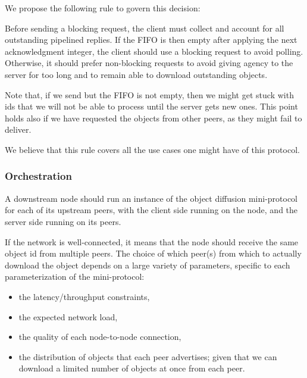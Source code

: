 We propose the following rule to govern this decision:

Before sending a blocking request, the client must collect and account for all
outstanding pipelined replies. If the FIFO is then empty after applying the next
acknowledgment integer, the client should use a blocking request to avoid polling.
Otherwise, it should prefer non-blocking requests to avoid giving agency to the
server for too long and to remain able to download outstanding objects.

Note that, if we send \MsgRequestObjIdsB{} but the FIFO is not empty, then we might get stuck with ids that we will not be able to process until the server gets new ones.
This point holds also if we have requested the objects from other peers, as they might fail to deliver.

We believe that this rule covers all the use cases one might have of this protocol.

\subsubsection{Orchestration}

A downstream node should run an instance of the object diffusion mini-protocol
for each of its upstream peers, with the client side running on the node, and
the server side running on its peers.

If the network is well-connected, it means that the node should receive the same object id
from multiple peers. The choice of which peer(s) from which to actually download the object
depends on a large variety of parameters, specific to each parameterization of the mini-protocol:
\begin{itemize}
  \item the latency/throughput constraints,
  \item the expected network load,
  \item the quality of each node-to-node connection,
  \item the distribution of objects that each peer advertises; given that we can download a limited number of objects at once from each peer.
\end{itemize}

